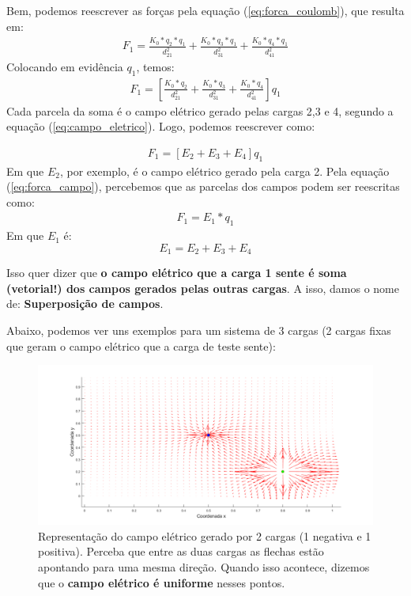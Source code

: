 \documentclass[12pt]{extarticle}
\newcommand{\<}{\langle}
\renewcommand{\>}{\rangle}
\theoremstyle{definition}
\begin{document}
Bem, podemos reescrever as forças pela equação (\ref{eq:forca_coulomb}), que resulta em:
\begin{align*}
    F_{1} = \frac{K_{0}*q_{2}*q_{1}}{d_{21}^{2}} + \frac{K_{0}*q_{3}*q_{1}}{d_{31}^{2}} + \frac{K_{0}*q_{4}*q_{1}}{d_{41}^{2}}
\end{align*}
Colocando em evidência $q_{1}$, temos:
\begin{align*}
    F_{1} = [\frac{K_{0}*q_{2}}{d_{21}^{2}} + \frac{K_{0}*q_{3}}{d_{31}^{2}} + \frac{K_{0}*q_{4}}{d_{41}^{2}}] q_{1}
\end{align*}
Cada parcela da soma é o campo elétrico gerado pelas cargas 2,3 e 4, segundo a equação (\ref{eq:campo_eletrico}). Logo, podemos reescrever como:

\begin{align*}
    F_{1} = [E_{2} + E_{3} + E_{4}]q_{1}
\end{align*}
Em que $E_{2}$, por exemplo, é o campo elétrico gerado pela carga 2. 
Pela equação (\ref{eq:forca_campo}), percebemos que as parcelas dos campos podem ser reescritas como:
\begin{align*}
    F_{1} = E_{1}*q_{1}
\end{align*}
Em que $E_{1}$ é:
\begin{equation} \label{eq:superpos_campo}
    E_{1} = E_{2} + E_{3} + E_{4}
\end{equation}

Isso quer dizer que \textbf{o campo elétrico que a carga 1 sente é soma (vetorial!) dos campos gerados pelas outras cargas}. A isso, damos o nome de: \textbf{Superposição de campos}.

Abaixo, podemos ver uns exemplos para um sistema de 3 cargas (2 cargas fixas que geram o campo elétrico que a carga de teste sente):
 \begin{figure} [H]
     \centering
     \includegraphics[width=\linewidth]{campo_eletrico_neg_pos.png}
     \caption{Representação do campo elétrico gerado por 2 cargas (1 negativa e 1 positiva). Perceba que entre as duas cargas as flechas estão apontando para uma mesma direção. Quando isso acontece, dizemos que o \textbf{campo elétrico é uniforme} nesses pontos.}
     \label{fig:campo_neg_pos}
 \end{figure}
 
\end{document}
